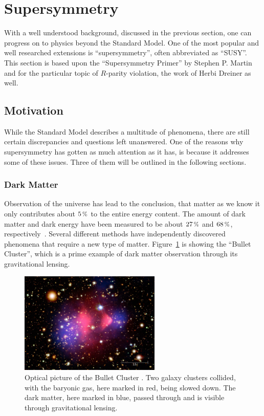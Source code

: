 \section{Supersymmetry}

With a well understood background, discussed in the previous section, one can progress on to physics beyond the Standard Model. One of the most popular and well researched extensions is ``supersymmetry'', often abbreviated as ``SUSY''. This section is based upon the ``Supersymmetry Primer'' by Stephen P. Martin~\cite{susyprimer} and for the particular topic of $R$-parity violation, the work of Herbi Dreiner as well.

\subsection{Motivation}

While the Standard Model describes a multitude of phenomena, there are still certain discrepancies and questions left unanswered. One of the reasons why supersymmetry has gotten as much attention as it has, is because it addresses some of these issues. Three of them will be outlined in the following sections.

\subsubsection{Dark Matter}
\label{sec:dm}

Observation of the universe has lead to the conclusion, that matter as we know it only contributes about $5\,\pct$ to the entire energy content. The amount of dark matter and dark energy have been measured to be about $27\,\pct$ and $68\,\pct$, respectively~\cite{planck}. Several different methods have independently discovered phenomena that require a new type of matter. Figure~\ref{fig:gravlens} is showing the ``Bullet Cluster'', which is a prime example of dark matter observation through its gravitational lensing.

\begin{figure}[ht!]
  \centering
  \includegraphics[width=0.6\textwidth]{plots/bulletcluster.jpg}
  \caption{Optical picture of the Bullet Cluster \cite{gravlens}. Two galaxy clusters collided, with the baryonic gas, here marked in red, being slowed down. The dark matter, here marked in blue, passed through and is visible through gravitational lensing.}
  \label{fig:gravlens}
\end{figure}

